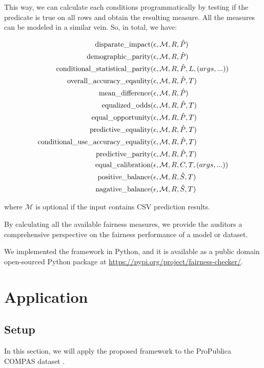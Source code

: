 \documentclass[conference]{IEEEtran}
\begin{document}
This way, we can calculate each conditions programmatically by testing if the predicate is true on all rows and obtain the resulting measure. All the measures can be modeled in a similar vein. So, in total, we have:

\begin{align*}
\text{disparate\_impact} & (\epsilon, \mathcal{M}, R, \hat{P}) \\
\text{demographic\_parity} & (\epsilon, \mathcal{M}, R, \hat{P}) \\
\text{conditional\_statistical\_parity} & (\epsilon, \mathcal{M}, R, \hat{P}, L, (args, ...)) \\
\text{overall\_accuracy\_eqaulity} & (\epsilon, \mathcal{M}, R, \hat{P}, T) \\
\text{mean\_difference} & (\epsilon, \mathcal{M}, R, \hat{P}) \\
\text{equalized\_odds} & (\epsilon, \mathcal{M}, R, \hat{P}, T) \\
\text{equal\_opportunity} & (\epsilon, \mathcal{M}, R, \hat{P}, T) \\
\text{predictive\_equality} & (\epsilon, \mathcal{M}, R, \hat{P}, T) \\
\text{conditional\_use\_accuracy\_equality} & (\epsilon, \mathcal{M}, R, \hat{P}, T) \\
\text{predictive\_parity} & (\epsilon, \mathcal{M}, R, \hat{P}, T) \\
\text{equal\_calibration} & (\epsilon, \mathcal{M}, R, C, T, (args, ...)) \\
\text{positive\_balance} & (\epsilon, \mathcal{M}, R, \hat{S}, T) \\
\text{nagative\_balance} & (\epsilon, \mathcal{M}, R, \hat{S}, T) \\
\end{align*}

where $\mathcal{M}$ is optional if the input contains CSV prediction results.

By calculating all the available fairness measures, we provide the auditors a comprehensive perspective on the fairness performance of a model or dataset.

We implemented the framework in Python, and it is available as a public domain open-sourced Python package at \url{https://pypi.org/project/fairness-checker/}.

\section{Application}
\subsection{Setup}
\label{sec:app}
In this section, we will apply the proposed framework to the ProPublica COMPAS dataset \cite{angwin2016machine,larson2016compas,larson2016propublica}.
\end{document}
